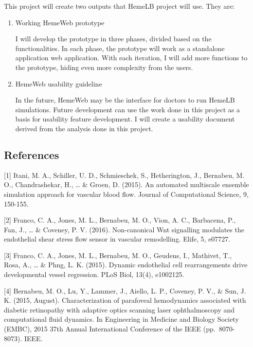 \documentclass[]{article}
\begin{document}
This project will create two outputs that HemeLB project will use. They
are:

\begin{enumerate}
\def\labelenumi{\arabic{enumi}.}
\item
  Working HemeWeb prototype

  I will develop the prototype in three phases, divided based on the
  functionalities. In each phase, the prototype will work as a
  standalone application web application. With each iteration, I will
  add more functions to the prototype, hiding even more complexity from
  the users.
\item
  HemeWeb usability guideline

  In the future, HemeWeb may be the interface for doctors to run HemeLB
  simulations. Future development can use the work done in this project
  as a basis for usability feature development. I will create a
  usability document derived from the analysis done in this project.
\end{enumerate}

\subsection{References}\label{references}

{[}1{]} Itani, M. A., Schiller, U. D., Schmieschek, S., Hetherington,
J., Bernabeu, M. O., Chandrashekar, H., \ldots{} \& Groen, D. (2015). An
automated multiscale ensemble simulation approach for vascular blood
flow. Journal of Computational Science, 9, 150-155.

{[}2{]} Franco, C. A., Jones, M. L., Bernabeu, M. O., Vion, A. C.,
Barbacena, P., Fan, J., \ldots{} \& Coveney, P. V. (2016). Non-canonical
Wnt signalling modulates the endothelial shear stress flow sensor in
vascular remodelling. Elife, 5, e07727.

{[}3{]} Franco, C. A., Jones, M. L., Bernabeu, M. O., Geudens, I.,
Mathivet, T., Rosa, A., \ldots{} \& Phng, L. K. (2015). Dynamic
endothelial cell rearrangements drive developmental vessel regression.
PLoS Biol, 13(4), e1002125.

{[}4{]} Bernabeu, M. O., Lu, Y., Lammer, J., Aiello, L. P., Coveney, P.
V., \& Sun, J. K. (2015, August). Characterization of parafoveal
hemodynamics associated with diabetic retinopathy with adaptive optics
scanning laser ophthalmoscopy and computational fluid dynamics. In
Engineering in Medicine and Biology Society (EMBC), 2015 37th Annual
International Conference of the IEEE (pp.~8070-8073). IEEE.
\end{document}

